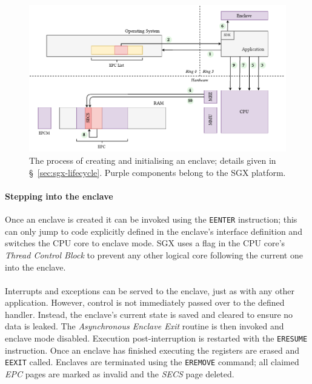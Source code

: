 \begin{figure}[]
    \centering
    \includegraphics[width=\linewidth]{figures/SGX-EnclaveCreate.pdf}
    \captionsetup{justification=centering}
    \caption[The process of creating and initialising an enclave.]{The process of creating and initialising an enclave; details given in §~\ref{sec:sgx-lifecycle}. Purple components belong to the SGX platform.}
    \label{fig:sgx-enclavecreate}
\end{figure}

\paragraph{Stepping into the enclave} Once an enclave is created it can be invoked using the \texttt{EENTER} instruction; this can only jump to code explicitly defined in the enclave's interface definition and switches the CPU core to enclave mode. SGX uses a flag in the CPU core's \textit{Thread Control Block} to prevent any other logical core following the current one into the enclave.

\paragraph{} Interrupts and exceptions can be served to the enclave, just as with any other application. However, control is not immediately passed over to the defined handler. Instead, the enclave's current state is saved and cleared to ensure no data is leaked. The \textit{Asynchronous Enclave Exit} routine is then invoked and enclave mode disabled. Execution post-interruption is restarted with the \texttt{ERESUME} instruction. Once an enclave has finished executing the registers are erased and \texttt{EEXIT} called. Enclaves are terminated using the \texttt{EREMOVE} command; all claimed \textit{EPC} pages are marked as invalid and the \textit{SECS} page deleted.

